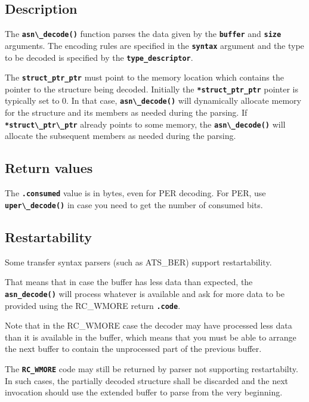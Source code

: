 \documentclass[english,oneside,12pt]{book}
\newcommand{\code}[1]{\texttt{\textbf{\lstinline{#1}}}}
\begin{document}
\subsection*{Description}

The \code{asn\_decode()} function parses the data given by the \code{buffer}
and \code{size} arguments. The encoding rules are specified in the \code{syntax}
argument and the type to be decoded is specified by the \code{type_descriptor}.

The \code{struct_ptr_ptr} must point to the memory location which contains the
pointer to the structure being decoded. Initially the \code{*struct_ptr_ptr}
pointer is typically set to 0. In that case, \code{asn\_decode()} will
dynamically allocate memory for the structure and its members as needed
during the parsing.
If \code{*struct\_ptr\_ptr} already points to some memory, the \code{asn\_decode()}
will allocate the subsequent members as needed during the parsing.

\subsection*{Return values}



The \code{.consumed} value is in bytes, even for PER decoding.
For PER, use \code{uper\_decode()} in case you need to get
the number of consumed bits.

\subsection*{Restartability}

Some transfer syntax parsers (such as ATS\_BER) support restartability.

That means that in case the buffer has less data than expected,
the \code{asn_decode()} will process whatever is available and ask for more
data to be provided using the RC\_WMORE return \code{.code}.

Note that in the RC\_WMORE case the decoder may have processed less data than
it is available in the buffer, which means that you must be able to arrange
the next buffer to contain the unprocessed part of the previous buffer.

The \code{RC_WMORE} code may still be returned by parser not supporting
restartabilty. In such cases, the partially decoded structure shall be
discarded and the next invocation should use the extended buffer to parse
from the very beginning.
\end{document}
